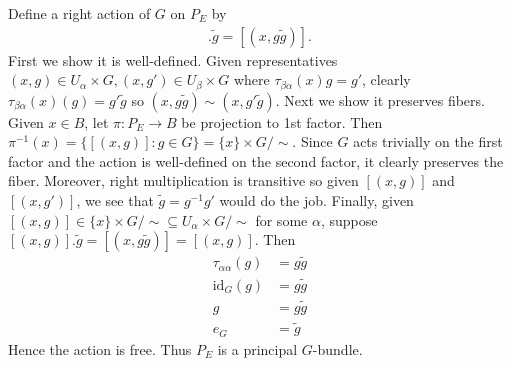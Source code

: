 \documentclass[12pt]{article}
\begin{document}
\begin{problem}[7]
\begin{enumerate}[label=(\arabic*)]
Define a right action of  $ G$ on  $ P_E$ by 
 \begin{align*}
	 [(x,g)].\widetilde{ g} = [(x, g \widetilde{ g})].
\end{align*}
First we show it is well-defined. Given representatives $(x,g) \in U_{ \alpha} \times G, (x,g') \in U_{ \beta} \times G$ where  $ \tau_{ \beta \alpha}(x)g=g'$, clearly $ \tau_{ \beta \alpha}(x) (g) = g' \widetilde{ g}$ so $ (x,g \widetilde{ g}) \sim (x, g' \widetilde{ g})$. Next we show it preserves fibers. Given $ x \in B$, let $ \pi: P_E \to B$ be projection to 1st factor. Then $ \pi ^{-1}(x) = \{[(x,g)]: g \in G\} = \{x\} \times G /\sim  $. Since $ G$ acts trivially on the first factor and the action is well-defined on the second factor, it clearly preserves the fiber. Moreover, right multiplication is transitive so given  $ [(x,g)]$ and  $ [(x,g')]$, we see that $ \widetilde{ g}=g^{-1}g'$ would do the job. Finally, given $ [(x,g)] \in \{x\} \times G / \sim \subseteq U_{ \alpha} \times G /\sim $ for some $ \alpha$, suppose $ [(x,g)].\widetilde{ g} = [(x,g\widetilde{ g})] = [(x,g)]$. Then
\begin{align*}
	\tau_{ \alpha \alpha}(g) &= g \widetilde{ g} \\
	\text{id}_{ G} (g)&= g \widetilde{ g} \\
	g &= g \widetilde{ g} \\
	e_G &= \widetilde{ g} 
\end{align*}
Hence the action is free. Thus $ P_E$ is a principal  $ G$-bundle.

\end{enumerate}
\end{problem}
\end{document}
